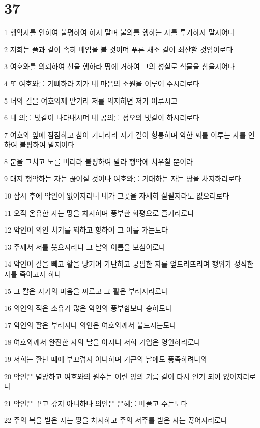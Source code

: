 \chapter{37}

\par 1 행악자를 인하여 불평하여 하지 말며 불의를 행하는 자를 투기하지 말지어다
\par 2 저희는 풀과 같이 속히 베임을 볼 것이며 푸른 채소 같이 쇠잔할 것임이로다
\par 3 여호와를 의뢰하여 선을 행하라 땅에 거하여 그의 성실로 식물을 삼을지어다
\par 4 또 여호와를 기뻐하라 저가 네 마음의 소원을 이루어 주시리로다
\par 5 너의 길을 여호와께 맡기라 저를 의지하면 저가 이루시고
\par 6 네 의를 빛같이 나타내시며 네 공의를 정오의 빛같이 하시리로다
\par 7 여호와 앞에 잠잠하고 참아 기다리라 자기 길이 형통하며 악한 꾀를 이루는 자를 인하여 불평하여 말지어다
\par 8 분을 그치고 노를 버리라 불평하여 말라 행악에 치우칠 뿐이라
\par 9 대저 행악하는 자는 끊어질 것이나 여호와를 기대하는 자는 땅을 차지하리로다
\par 10 잠시 후에 악인이 없어지리니 네가 그곳을 자세히 살필지라도 없으리로다
\par 11 오직 온유한 자는 땅을 차지하며 풍부한 화평으로 즐기리로다
\par 12 악인이 의인 치기를 꾀하고 향하여 그 이를 가는도다
\par 13 주께서 저를 웃으시리니 그 날의 이름을 보심이로다
\par 14 악인이 칼을 빼고 활을 당기어 가난하고 궁핍한 자를 엎드러뜨리며 행위가 정직한 자를 죽이고자 하나
\par 15 그 칼은 자기의 마음을 찌르고 그 활은 부러지리로다
\par 16 의인의 적은 소유가 많은 악인의 풍부함보다 승하도다
\par 17 악인의 팔은 부러지나 의인은 여호와께서 붙드시는도다
\par 18 여호와께서 완전한 자의 날을 아시니 저희 기업은 영원하리로다
\par 19 저희는 환난 때에 부끄럽지 아니하며 기근의 날에도 풍족하려니와
\par 20 악인은 멸망하고 여호와의 원수는 어린 양의 기름 같이 타서 연기 되어 없어지리로다
\par 21 악인은 꾸고 갚지 아니하나 의인은 은혜를 베풀고 주는도다
\par 22 주의 복을 받은 자는 땅을 차지하고 주의 저주를 받은 자는 끊어지리로다
